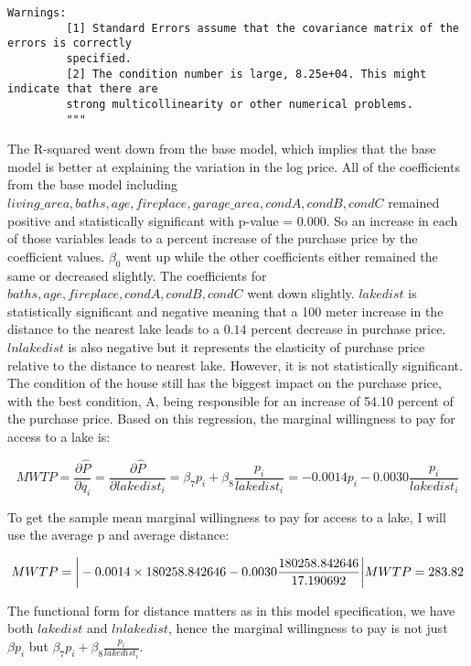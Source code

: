 \documentclass[11pt]{article}
\begin{document}
\begin{Verbatim}[commandchars=\\\{\}]
         Warnings:
         [1] Standard Errors assume that the covariance matrix of the errors is correctly 
         specified.
         [2] The condition number is large, 8.25e+04. This might indicate that there are
         strong multicollinearity or other numerical problems.
         """
\end{Verbatim}
            
    The R-squared went down from the base model, which implies that the base
model is better at explaining the variation in the log price. All of the
coefficients from the base model including
\(living\_area, baths, age, fireplace, garage\_area, condA, condB, condC\)
remained positive and statistically significant with p-value = 0.000. So
an increase in each of those variables leads to a percent increase of
the purchase price by the coefficient values. \(\beta_0\) went up while
the other coefficients either remained the same or decreased slightly.
The coefficients for \(baths, age, fireplace, condA, condB, condC\) went
down slightly. \(lakedist\) is statistically significant and negative
meaning that a 100 meter increase in the distance to the nearest lake
leads to a \(0.14\) percent decrease in purchase price. \(lnlakedist\)
is also negative but it represents the elasticity of purchase price
relative to the distance to nearest lake. However, it is not
statistically significant. The condition of the house still has the
biggest impact on the purchase price, with the best condition, A, being
responsible for an increase of 54.10 percent of the purchase price.
Based on this regression, the marginal willingness to pay for access to
a lake is:

\begin{equation}
MWTP = \frac{\partial \widehat{P}}{\partial q_i} = \frac{\partial \widehat{P}}{\partial lakedist_i} = \beta_7 p_i +  \beta_8 \frac{p_i}{lakedist_i} =  -0.0014 p_i - 0.0030 \frac{p_i}{lakedist_i} 
\end{equation}

To get the sample mean marginal willingness to pay for access to a lake,
I will use the average p and average distance:

\begin{equation}
MWTP = \bigg\lvert -0.0014 \times 180258.842646 - 0.0030 \frac{180258.842646}{17.190692} \bigg\rvert \\
MWTP = 283.82
\end{equation}

The functional form for distance matters as in this model specification,
we have both \(lakedist\) and \(lnlakedist\), hence the marginal
willingness to pay is not just \(\beta p_i\) but
\(\beta_7 p_i + \beta_8 \frac{p_i}{lakedist_i}\).
\end{document}
